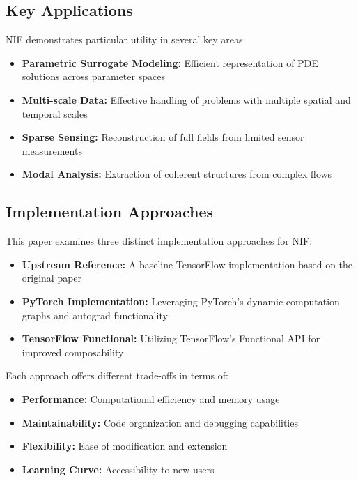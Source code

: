 \documentclass[10pt,journal,compsoc,onecolumn]{IEEEtran}
\begin{document}
\subsection{Key Applications}
NIF demonstrates particular utility in several key areas:

\begin{itemize}
    \item \textbf{Parametric Surrogate Modeling:} Efficient representation of PDE solutions across parameter spaces
    \item \textbf{Multi-scale Data:} Effective handling of problems with multiple spatial and temporal scales
    \item \textbf{Sparse Sensing:} Reconstruction of full fields from limited sensor measurements
    \item \textbf{Modal Analysis:} Extraction of coherent structures from complex flows
\end{itemize}

\subsection{Implementation Approaches}
This paper examines three distinct implementation approaches for NIF:

\begin{itemize}
    \item \textbf{Upstream Reference:} A baseline TensorFlow implementation based on the original paper
    \item \textbf{PyTorch Implementation:} Leveraging PyTorch's dynamic computation graphs and autograd functionality
    \item \textbf{TensorFlow Functional:} Utilizing TensorFlow's Functional API for improved composability
\end{itemize}

Each approach offers different trade-offs in terms of:

\begin{itemize}
    \item \textbf{Performance:} Computational efficiency and memory usage
    \item \textbf{Maintainability:} Code organization and debugging capabilities
    \item \textbf{Flexibility:} Ease of modification and extension
    \item \textbf{Learning Curve:} Accessibility to new users
\end{itemize}
\end{document}
